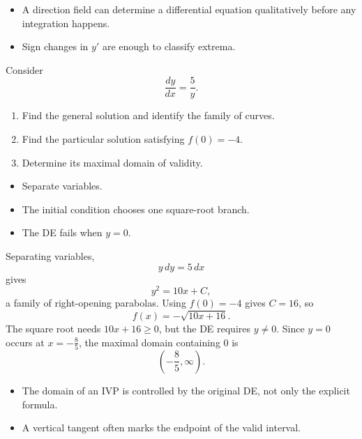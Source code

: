 \begin{takeaways}
\begin{itemize}[leftmargin=*]
    \item A direction field can determine a differential equation qualitatively before any integration happens.
    \item Sign changes in $y'$ are enough to classify extrema.
\end{itemize}
\end{takeaways}

\begin{problem}
Consider
\[
\frac{dy}{dx}=\frac{5}{y}.
\]
\begin{enumerate}
    \item[\textbf{i}] Find the general solution and identify the family of curves.
    \item[\textbf{ii}] Find the particular solution satisfying $f(0)=-4$.
    \item[\textbf{iii}] Determine its maximal domain of validity.
\end{enumerate}
\end{problem}

\begin{hint}
\begin{itemize}[leftmargin=*]
    \item Separate variables.
    \item The initial condition chooses one square-root branch.
    \item The DE fails when $y=0$.
\end{itemize}
\end{hint}

\begin{solution}
Separating variables,
\[
y\,dy=5\,dx
\]
gives
\[
\boxed{y^2=10x+C},
\]
a family of right-opening parabolas. Using $f(0)=-4$ gives $C=16$, so
\[
\boxed{f(x)=-\sqrt{10x+16}}.
\]
The square root needs $10x+16\ge0$, but the DE requires $y\neq0$. Since $y=0$ occurs at $x=-\frac85$, the maximal domain containing $0$ is
\[
\boxed{\left(-\frac85,\infty\right)}.
\]
\end{solution}

\begin{takeaways}
\begin{itemize}[leftmargin=*]
    \item The domain of an IVP is controlled by the original DE, not only the explicit formula.
    \item A vertical tangent often marks the endpoint of the valid interval.
\end{itemize}
\end{takeaways}

